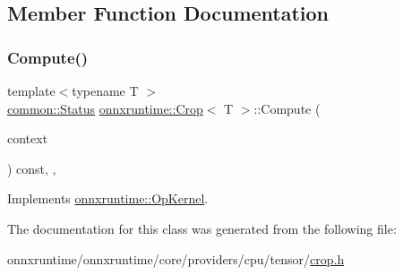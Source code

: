 \subsection{Member Function Documentation}
\mbox{\label{classonnxruntime_1_1Crop_aab20aca15fa7501ee25794b662c47f14}} 
\subsubsection{\texorpdfstring{Compute()}{Compute()}}
{\footnotesize\ttfamily template$<$typename T $>$ \\
\mbox{\hyperlink{classonnxruntime_1_1common_1_1Status}{common\+::\+Status}} \mbox{\hyperlink{classonnxruntime_1_1Crop}{onnxruntime\+::\+Crop}}$<$ T $>$\+::Compute (\begin{DoxyParamCaption}\item[{\mbox{\hyperlink{classonnxruntime_1_1OpKernelContext}{Op\+Kernel\+Context}} $\ast$}]{context }\end{DoxyParamCaption}) const\hspace{0.3cm}{\ttfamily [inline]}, {\ttfamily [override]}, {\ttfamily [virtual]}}



Implements \mbox{\hyperlink{classonnxruntime_1_1OpKernel_a9eca8656a78b1b3ab9d3351a12798650}{onnxruntime\+::\+Op\+Kernel}}.



The documentation for this class was generated from the following file\+:\begin{DoxyCompactItemize}
\item 
onnxruntime/onnxruntime/core/providers/cpu/tensor/\mbox{\hyperlink{cpu_2tensor_2crop_8h}{crop.\+h}}\end{DoxyCompactItemize}
